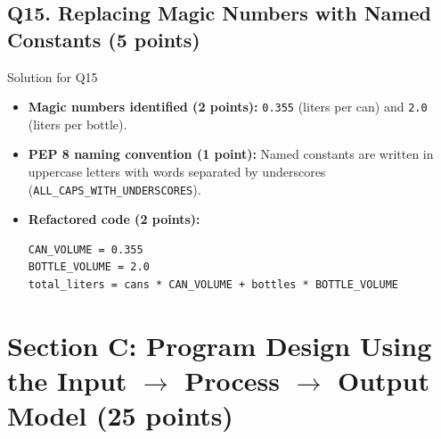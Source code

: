 \documentclass[11pt,a4paper]{article}
\begin{document}
\subsection*{Q15. Replacing Magic Numbers with Named Constants (5 points)}
\begin{solbox}{Solution for Q15}
\begin{itemize}[leftmargin=2em]
  \item \textbf{Magic numbers identified (2 points):} \texttt{0.355} (liters per can) and \texttt{2.0} (liters per bottle).
  \item \textbf{PEP 8 naming convention (1 point):} Named constants are written in uppercase letters with words separated by underscores (\texttt{ALL\_CAPS\_WITH\_UNDERSCORES}).
  \item \textbf{Refactored code (2 points):}
\begin{lstlisting}
CAN_VOLUME = 0.355
BOTTLE_VOLUME = 2.0
total_liters = cans * CAN_VOLUME + bottles * BOTTLE_VOLUME
\end{lstlisting}
\end{itemize}
\end{solbox}

\newpage

\section*{Section C: Program Design Using the Input $\rightarrow$ Process $\rightarrow$ Output Model (25 points)}
\end{document}

